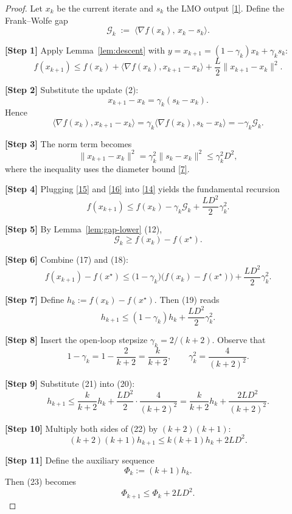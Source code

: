 \documentclass{article}
\newcommand{\gap}{\mathcal{G}}
\begin{document}
\begin{proof}
Let $x_k$ be the current iterate and $s_k$ the LMO output \eqref{1}. Define the Frank–Wolfe gap
\[
\gap_k \;:=\; \langle \nabla f(x_k),\,x_k-s_k\rangle .
\tag{13}
\]

\noindent\textbf{[Step 1]} Apply Lemma~\ref{lem:descent} with $y=x_{k+1}=(1-\gamma_k)x_k+\gamma_k s_k$:
\[
f(x_{k+1})\le f(x_k)+\langle\nabla f(x_k),x_{k+1}-x_k\rangle+\frac{L}{2}\|x_{k+1}-x_k\|^{2}.
\tag{14}
\]

\noindent\textbf{[Step 2]} Substitute the update (2):
\[
x_{k+1}-x_k = \gamma_k (s_k-x_k).
\]
Hence
\[
\langle\nabla f(x_k),x_{k+1}-x_k\rangle = \gamma_k\langle\nabla f(x_k),s_k-x_k\rangle = -\gamma_k \gap_k .
\tag{15}
\]

\noindent\textbf{[Step 3]} The norm term becomes
\[
\|x_{k+1}-x_k\|^{2}= \gamma_k^{2}\|s_k-x_k\|^{2}\le \gamma_k^{2}D^{2},
\tag{16}
\]
where the inequality uses the diameter bound \eqref{7}.

\noindent\textbf{[Step 4]} Plugging \eqref{15} and \eqref{16} into \eqref{14} yields the fundamental recursion
\[
f(x_{k+1}) \le f(x_k) -\gamma_k \gap_k + \frac{L D^{2}}{2}\gamma_k^{2}.
\tag{17}
\]

\noindent\textbf{[Step 5]} By Lemma~\ref{lem:gap-lower} (12),
\[
\gap_k \ge f(x_k)-f(x^\star).
\tag{18}
\]

\noindent\textbf{[Step 6]} Combine (17) and (18):
\[
f(x_{k+1})-f(x^\star) \le \bigl(1-\gamma_k\bigr)\bigl(f(x_k)-f(x^\star)\bigr)+\frac{L D^{2}}{2}\gamma_k^{2}.
\tag{19}
\]

\noindent\textbf{[Step 7]} Define $h_k:=f(x_k)-f(x^\star)$. Then (19) reads
\[
h_{k+1}\le (1-\gamma_k)h_k+\frac{L D^{2}}{2}\gamma_k^{2}.
\tag{20}
\]

\noindent\textbf{[Step 8]} Insert the open‑loop stepsize $\gamma_k=2/(k+2)$. Observe that
\[
1-\gamma_k = 1-\frac{2}{k+2}= \frac{k}{k+2},\qquad
\gamma_k^{2}= \frac{4}{(k+2)^{2}} .
\tag{21}
\]

\noindent\textbf{[Step 9]} Substitute (21) into (20):
\[
h_{k+1}\le \frac{k}{k+2}h_k+\frac{L D^{2}}{2}\cdot\frac{4}{(k+2)^{2}}
          = \frac{k}{k+2}h_k+\frac{2L D^{2}}{(k+2)^{2}} .
\tag{22}
\]

\noindent\textbf{[Step 10]} Multiply both sides of (22) by $(k+2)(k+1)$:
\[
(k+2)(k+1)h_{k+1}\le k(k+1)h_k+2L D^{2}.
\tag{23}
\]

\noindent\textbf{[Step 11]} Define the auxiliary sequence
\[
\Phi_k := (k+1)h_k .
\tag{24}
\]
Then (23) becomes
\[
\Phi_{k+1}\le \Phi_k + 2L D^{2}.
\tag{25}
\]


\end{proof}
\end{document}

